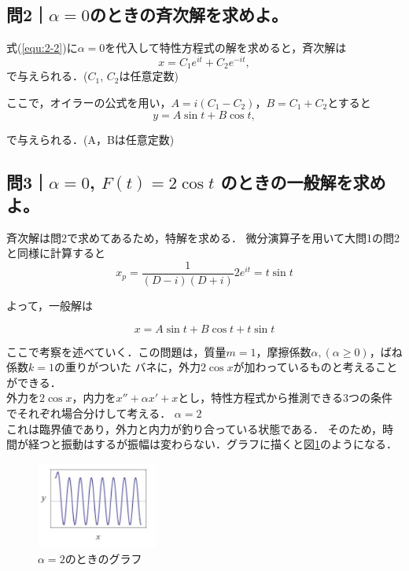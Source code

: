 \documentclass[a4paper,11pt]{bxjsarticle}
\begin{document}
\subsection{問2｜$\alpha=0$のときの斉次解を求めよ。}
式(\ref{equ:2-2})に$\alpha=0$を代入して特性方程式の解を求めると，斉次解は
\begin{equation}
  x= C_1e^{it}+C_2e^{-it}, 
\end{equation}
で与えられる．($C_1$, $C_2$は任意定数)

ここで，オイラーの公式を用い，$A=i(C_1-C_2)，B=C_1+C_2$とすると
\begin{equation}
  y= A\sin t + B\cos t, 
\end{equation}

で与えられる．(A，Bは任意定数)

\subsection{問3｜$\alpha=0$, $F(t)=2\cos t$ のときの一般解を求めよ。}
斉次解は問2で求めてあるため，特解を求める．
微分演算子を用いて大問1の問2と同様に計算すると
\begin{equation}
  x_p=\frac{1}{(D-i)(D+i)}2e^{it}=t\sin t
\end{equation}

よって，一般解は

\begin{equation}
  x = A\sin t + B\cos t + t\sin t
\end{equation}

ここで考察を述べていく．この問題は，質量$m=1$，摩擦係数$\alpha,(\alpha \geq 0)$，ばね係数$k=1$の重りがついた
バネに，外力$2\cos x$が加わっているものと考えることができる．\\
外力を$2\cos x$，内力を$x'' + \alpha x' + x$とし，特性方程式から推測できる3つの条件でそれぞれ場合分けして考える．
\newpage
\underline{$\alpha=2$}\\
これは臨界値であり，外力と内力が釣り合っている状態である．
そのため，時間が経つと振動はするが振幅は変わらない．グラフに描くと図\ref{fig:2}のようになる．

\begin{figure}[!htbp]
  \centering  %
  \includegraphics[clip,width = 4.0cm]{2.jpg}
  \caption{$\alpha=2$のときのグラフ}
  \label{fig:2}
  \end{figure}
\end{document}
